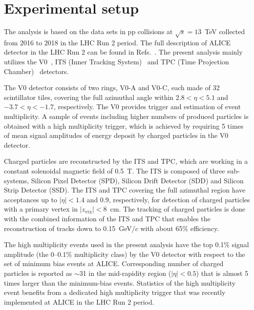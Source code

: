

\section{Experimental setup}
\label{sec:experiment}

The analysis is based on the data sets in pp collisions at $\sqrt{s} = 13$~TeV collected from 2016 to 2018 in the LHC Run 2 period. The full description of ALICE detector in the LHC Run 2 can be found in Refs.~\cite{Aamodt:2008zz,Abelev:2014ffa}. The present analysis mainly utilizes the V0~\cite{Abbas:2013taa}, ITS (Inner Tracking System)~\cite{aliceITS} and TPC (Time Projection Chamber)~\cite{aliceTPC} detectors.


The V0 detector consists of two rings, V0-A and V0-C, each made of 32 scintillator tiles, covering the full azimuthal angle within $2.8 < \eta < 5.1$ and $-3.7 < \eta < -1.7$, respectively. The V0 provides trigger and estimation of event multiplicity. A sample of events including higher numbers of produced particles is obtained with a high multiplicity trigger, which is achieved by requiring 5 times of mean signal amplitudes of energy deposit by charged particles in the V0 detector.

Charged particles are reconstructed by the ITS and TPC, which are working in a constant solenoidal magnetic field of 0.5~T. The ITS is composed of three sub-systems, Silicon Pixel Detector (SPD), Silicon Drift Detector (SDD) and Silicon Strip Detector (SSD). The ITS and TPC covering the full azimuthal region have acceptances up to $|\eta| < 1.4$ and 0.9, respectively, for detection of charged particles with a primary vertex in $|z_\mathrm{vtx}| < 8$~cm. The tracking of charged particles is done with the combined information of the ITS and TPC that enables the reconstruction of tracks down to 0.15~GeV/$c$ with about 65\% efficiency.

The high multiplicity events used in the present analysis have the top 0.1\% signal amplitude (the 0--0.1\% multiplicity class) by the V0 detector with respect to the set of minimum bias events at ALICE. Corresponding number of charged particles is reported as $\sim$31 in the mid-rapidity region ($|\eta|<0.5$) that is almost 5 times larger than the minimum-bias events. Statistics of the high multiplicity event benefits from a dedicated high multiplicity trigger that was recently implemented at ALICE  in the LHC Run 2 period.  
 


